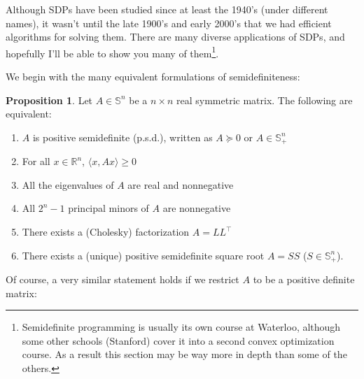 \documentclass{article}
\numberwithin{equation}{section}
\theoremstyle{definition}
\newtheorem{proposition}[theorem]{Proposition}
\newcommand{\bR}{\mathbb{R}}
\newcommand{\bS}{\mathbb{S}}
\begin{document}
Although SDPs have been studied since at least the 1940's (under different names), it wasn't until the late 1900's and early 2000's that we had efficient algorithms for solving them. There are many diverse applications of SDPs, and hopefully I'll be able to show you many of them\footnote{Semidefinite programming is usually its own course at Waterloo, although some other schools (Stanford) cover it into a second convex optimization course. As a result this section may be way more in depth than some of the others.}.

We begin with the many equivalent formulations of semidefiniteness:
\begin{proposition}
    Let $A\in\bS^n$ be a $n\times n$ real symmetric matrix. The following are equivalent:
    \begin{enumerate}[label=(\roman*)]
        \item $A$ is positive semidefinite (p.s.d.), written as $A\succeq 0$ or $A\in\bS_+^n$
        \item For all $x\in\bR^n$, $\langle x, Ax\rangle\ge0$
        \item All the eigenvalues of $A$ are real and nonnegative
        \item All $2^n-1$ principal minors of $A$ are nonnegative
        \item There exists a (Cholesky) factorization $A=LL^\top$
        \item There exists a (unique) positive semidefinite square root $A=SS$ ($S\in\bS_+^n$).
    \end{enumerate}
\end{proposition}
Of course, a very similar statement holds if we restrict $A$ to be a positive definite matrix:
\end{document}
